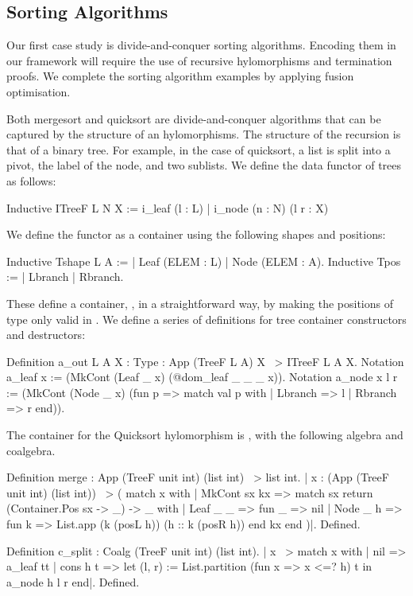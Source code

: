 \documentclass{llncs}
\newcommand{\mpav}[1]{\textcolor{red}{\textsc{Marco}: #1}}
\begin{document}
\subsection{Sorting Algorithms}\label{sec:sorting}
Our first case study is divide-and-conquer sorting algorithms.  Encoding them
in our framework will require the use of recursive hylomorphisms and
termination proofs.  We complete the sorting algorithm examples by applying
fusion optimisation.

Both mergesort and quicksort are divide-and-conquer algorithms that can be
captured by the structure of an hylomorphisms. The structure of the recursion
is that of a binary tree.  For example, in the case of quicksort, a list is
split into a pivot, the label of the node, and two sublists. We define the data
functor of trees as follows:
\begin{coqcode}
Inductive ITreeF L N X := i_leaf (l : L) | i_node (n : N) (l r : X)
\end{coqcode}
We define the functor as a container using the following shapes and positions:
\begin{coqcode}
Inductive Tshape L A := | Leaf (ELEM : L) | Node (ELEM : A).
Inductive Tpos := | Lbranch | Rbranch. 
\end{coqcode}
These define a container, , in a straightforward way, by making
the positions of type  only valid in .
We define a series of definitions for tree container constructors and 
destructors:
\begin{coqcode}
Definition a_out {L A X : Type} : App (TreeF L A) X ~> ITreeF L A X.
Notation a_leaf x := (MkCont (Leaf _ x) (@dom_leaf _ _ _ x)).
Notation a_node x l r := (MkCont (Node _ x)
  (fun p => match val p with | Lbranch => l | Rbranch => r end)).
\end{coqcode}
The container for the Quicksort hylomorphism is , with
the following algebra and coalgebra.
\begin{coqcode}
  Definition merge : App (TreeF unit int) (list int) ~> list int.
|{ x : (App (TreeF unit int) (list int)) ~> (
           match x with
           | MkCont sx kx =>
               match sx return (Container.Pos sx -> _) -> _ with
               | Leaf _ _ => fun _ => nil
               | Node _ h => fun k => List.app (k (posL h)) (h :: k (posR h))
               end kx
           end
  )}|.
Defined.

Definition c_split : Coalg (TreeF unit int) (list int).
|{ x ~> match x with
        | nil => a_leaf tt
        | cons h t => let (l, r) := List.partition (fun x => x <=? h) t in
                      a_node h l r
        end}|.
Defined.
\end{coqcode}
\end{document}
